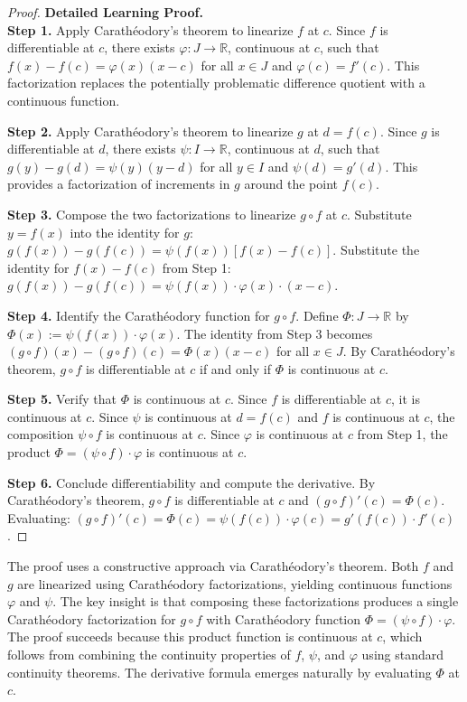 \begin{proof}
\textbf{Detailed Learning Proof.}~\\

\textbf{Step 1.} Apply Carathéodory's theorem to linearize $f$ at $c$. Since $f$ is differentiable at $c$, there exists $\varphi : J \to \mathbb{R}$, continuous at $c$, such that $f(x) - f(c) = \varphi(x)(x - c)$ for all $x \in J$ and $\varphi(c) = f'(c)$. This factorization replaces the potentially problematic difference quotient with a continuous function.

\textbf{Step 2.} Apply Carathéodory's theorem to linearize $g$ at $d = f(c)$. Since $g$ is differentiable at $d$, there exists $\psi : I \to \mathbb{R}$, continuous at $d$, such that $g(y) - g(d) = \psi(y)(y - d)$ for all $y \in I$ and $\psi(d) = g'(d)$. This provides a factorization of increments in $g$ around the point $f(c)$.

\textbf{Step 3.} Compose the two factorizations to linearize $g \circ f$ at $c$. Substitute $y = f(x)$ into the identity for $g$: $g(f(x)) - g(f(c)) = \psi(f(x))[f(x) - f(c)]$. Substitute the identity for $f(x) - f(c)$ from Step 1: $g(f(x)) - g(f(c)) = \psi(f(x)) \cdot \varphi(x) \cdot (x - c)$.

\textbf{Step 4.} Identify the Carathéodory function for $g \circ f$. Define $\Phi : J \to \mathbb{R}$ by $\Phi(x) := \psi(f(x)) \cdot \varphi(x)$. The identity from Step 3 becomes $(g \circ f)(x) - (g \circ f)(c) = \Phi(x)(x - c)$ for all $x \in J$. By Carathéodory's theorem, $g \circ f$ is differentiable at $c$ if and only if $\Phi$ is continuous at $c$.

\textbf{Step 5.} Verify that $\Phi$ is continuous at $c$. Since $f$ is differentiable at $c$, it is continuous at $c$. Since $\psi$ is continuous at $d = f(c)$ and $f$ is continuous at $c$, the composition $\psi \circ f$ is continuous at $c$. Since $\varphi$ is continuous at $c$ from Step 1, the product $\Phi = (\psi \circ f) \cdot \varphi$ is continuous at $c$.

\textbf{Step 6.} Conclude differentiability and compute the derivative. By Carathéodory's theorem, $g \circ f$ is differentiable at $c$ and $(g \circ f)'(c) = \Phi(c)$. Evaluating: $(g \circ f)'(c) = \Phi(c) = \psi(f(c)) \cdot \varphi(c) = g'(f(c)) \cdot f'(c)$.
\end{proof}

\begin{remark*}
The proof uses a constructive approach via Carathéodory's theorem. Both $f$ and $g$ are linearized using Carathéodory factorizations, yielding continuous functions $\varphi$ and $\psi$. The key insight is that composing these factorizations produces a single Carathéodory factorization for $g \circ f$ with Carathéodory function $\Phi = (\psi \circ f) \cdot \varphi$. The proof succeeds because this product function is continuous at $c$, which follows from combining the continuity properties of $f$, $\psi$, and $\varphi$ using standard continuity theorems. The derivative formula emerges naturally by evaluating $\Phi$ at $c$.
\end{remark*}

